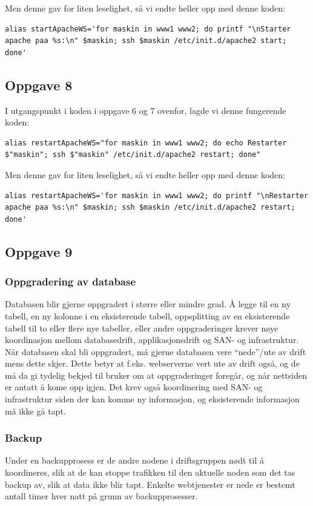 \documentclass[a4paper, norsk, 12pt]{article}
\begin{document}
Men denne gav for liten leselighet, så vi endte heller opp med denne koden:
\begin{verbatim}
alias startApacheWS='for maskin in www1 www2; do printf "\nStarter apache paa %s:\n" $maskin; ssh $maskin /etc/init.d/apache2 start; done'
\end{verbatim}

\subsection{Oppgave 8}
I utgangspunkt i koden i oppgave 6 og 7 ovenfor, lagde vi denne fungerende koden:
\begin{verbatim}
alias restartApacheWS="for maskin in www1 www2; do echo Restarter $"maskin"; ssh $"maskin" /etc/init.d/apache2 restart; done"
\end{verbatim}

Men denne gav for liten leselighet, så vi endte heller opp med denne koden:
\begin{verbatim}
alias restartApacheWS='for maskin in www1 www2; do printf "\nRestarter apache paa %s:\n" $maskin; ssh $maskin /etc/init.d/apache2 restart; done'
\end{verbatim}

\subsection{Oppgave 9}
\subsubsection*{Oppgradering av database}
Databasen blir gjerne oppgradert i større eller mindre grad. Å legge til en ny tabell, en ny kolonne i en eksisterende tabell, oppsplitting av en eksisterende tabell til to eller flere nye tabeller, eller andre oppgraderinger krever nøye koordinasjon mellom databasedrift, applikasjonsdrift og SAN- og infrastruktur. Når databasen skal bli oppgradert, må gjerne databasen vere “nede”/ute av drift mens dette skjer. Dette betyr at f.eks. webserverne vert ute av drift også, og de må da gi tydelig bekjed til bruker om at oppgraderinger foregår, og når nettsiden er antatt å kome opp igjen. Det krev også koordinering med SAN- og infrastruktur siden der kan komme ny informasjon, og eksisterende informasjon må ikke gå tapt.

\subsubsection*{Backup}
Under en backupprosess er de andre nodene i driftsgruppen nødt til å koordineres, slik at de kan stoppe trafikken til den aktuelle noden som det tas backup av, slik at data ikke blir tapt. Enkelte webtjenester er nede er bestemt antall timer hver natt på grunn av backupprosesser.
\end{document}
